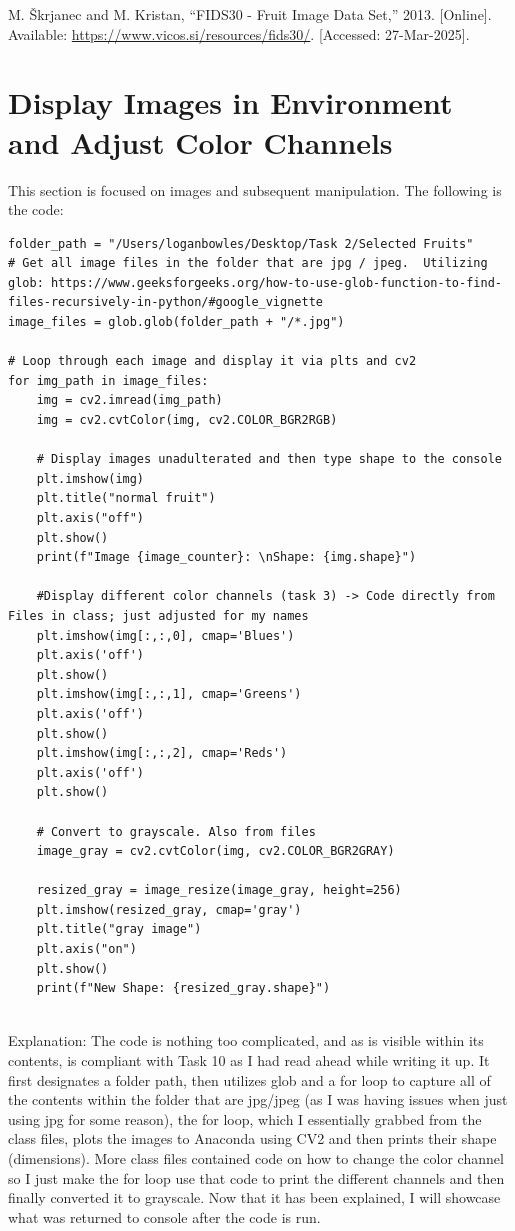 \documentclass[conference]{IEEEtran} %
\begin{document}
\begin{thebibliography}{1}
    M. Škrjanec and M. Kristan, ``FIDS30 - Fruit Image Data Set,'' 2013. [Online]. Available: \url{https://www.vicos.si/resources/fids30/}. [Accessed: 27-Mar-2025].
\end{thebibliography}

\section{Display Images in Environment and Adjust Color Channels}
This section is focused on images and subsequent manipulation.  The following is the code:

\begin{lstlisting}
folder_path = "/Users/loganbowles/Desktop/Task 2/Selected Fruits"
# Get all image files in the folder that are jpg / jpeg.  Utilizing glob: https://www.geeksforgeeks.org/how-to-use-glob-function-to-find-files-recursively-in-python/#google_vignette
image_files = glob.glob(folder_path + "/*.jpg")

# Loop through each image and display it via plts and cv2
for img_path in image_files:
    img = cv2.imread(img_path)
    img = cv2.cvtColor(img, cv2.COLOR_BGR2RGB)

    # Display images unadulterated and then type shape to the console
    plt.imshow(img)
    plt.title("normal fruit")  
    plt.axis("off")
    plt.show()
    print(f"Image {image_counter}: \nShape: {img.shape}")
    
    #Display different color channels (task 3) -> Code directly from Files in class; just adjusted for my names
    plt.imshow(img[:,:,0], cmap='Blues')
    plt.axis('off')
    plt.show()
    plt.imshow(img[:,:,1], cmap='Greens')
    plt.axis('off')
    plt.show()
    plt.imshow(img[:,:,2], cmap='Reds')
    plt.axis('off')
    plt.show()

    # Convert to grayscale. Also from files
    image_gray = cv2.cvtColor(img, cv2.COLOR_BGR2GRAY)
    
    resized_gray = image_resize(image_gray, height=256)
    plt.imshow(resized_gray, cmap='gray')
    plt.title("gray image")
    plt.axis("on")
    plt.show()
    print(f"New Shape: {resized_gray.shape}")
    
\end{lstlisting}
Explanation: The code is nothing too complicated, and as is visible within its contents, is compliant with Task 10 as I had read ahead while writing it up.  It first designates a folder path, then utilizes glob and a for loop to capture all of the contents within the folder that are jpg/jpeg (as I was having issues when just using jpg for some reason), the for loop, which I essentially grabbed from the class files, plots the images to Anaconda using CV2 and then prints their shape (dimensions).  More class files contained code on how to change the color channel so I just make the for loop use that code to print the different channels and then finally converted it to grayscale.  Now that it has been explained, I will showcase what was returned to console after the code is run.
\end{document}
